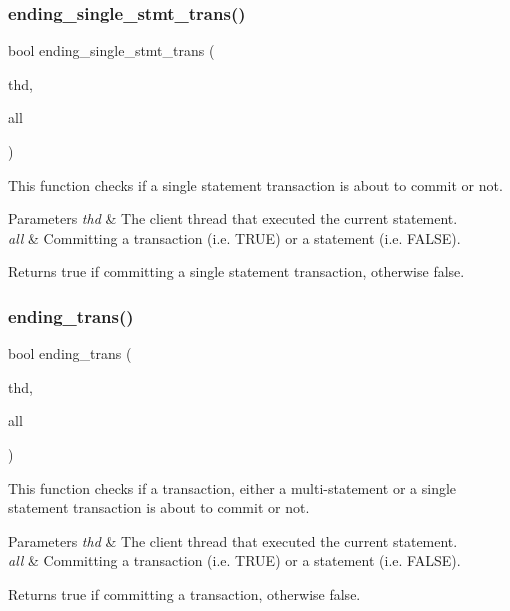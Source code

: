 \subsubsection{\texorpdfstring{ending\+\_\+single\+\_\+stmt\+\_\+trans()}{ending\_single\_stmt\_trans()}}
{\footnotesize\ttfamily bool ending\+\_\+single\+\_\+stmt\+\_\+trans (\begin{DoxyParamCaption}\item[{T\+HD $\ast$}]{thd,  }\item[{const bool}]{all }\end{DoxyParamCaption})}

This function checks if a single statement transaction is about to commit or not.


\begin{DoxyParams}{Parameters}
{\em thd} & The client thread that executed the current statement. \\
\hline
{\em all} & Committing a transaction (i.\+e. T\+R\+UE) or a statement (i.\+e. F\+A\+L\+SE). \\
\hline
\end{DoxyParams}
\begin{DoxyReturn}{Returns}
{\ttfamily true} if committing a single statement transaction, otherwise {\ttfamily false}. 
\end{DoxyReturn}
\mbox{\label{group__Binary__Log_gaad02774240e19d361a32bd35c9db60cb}} 
\subsubsection{\texorpdfstring{ending\+\_\+trans()}{ending\_trans()}}
{\footnotesize\ttfamily bool ending\+\_\+trans (\begin{DoxyParamCaption}\item[{T\+HD $\ast$}]{thd,  }\item[{const bool}]{all }\end{DoxyParamCaption})}

This function checks if a transaction, either a multi-\/statement or a single statement transaction is about to commit or not.


\begin{DoxyParams}{Parameters}
{\em thd} & The client thread that executed the current statement. \\
\hline
{\em all} & Committing a transaction (i.\+e. T\+R\+UE) or a statement (i.\+e. F\+A\+L\+SE). \\
\hline
\end{DoxyParams}
\begin{DoxyReturn}{Returns}
{\ttfamily true} if committing a transaction, otherwise {\ttfamily false}. 
\end{DoxyReturn}
\mbox{\label{group__Binary__Log_ga71a83004e5774879856189f84d00094f}} 
